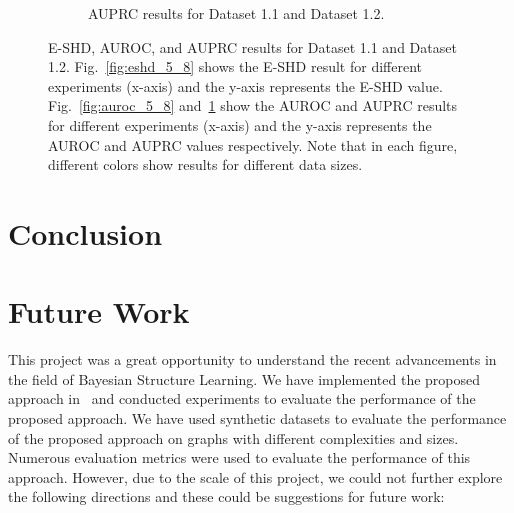 \documentclass{lxaiproposal}
\begin{document}
\begin{figure}[h]
\begin{subfigure}{0.98\textwidth}
            \caption{AUPRC results for Dataset 1.1 and Dataset 1.2.}
            \label{fig:auprc_5_8}
        \end{subfigure}
        \caption{E-SHD, AUROC, and AUPRC results for Dataset 1.1 and Dataset 1.2. Fig.~\ref{fig:eshd_5_8} shows
        the E-SHD result for different experiments (x-axis) and the y-axis represents the E-SHD value. Fig.~\ref{fig:auroc_5_8} and~\ref{fig:auprc_5_8} show the AUROC and AUPRC results for different experiments (x-axis) and the
        y-axis represents the AUROC and AUPRC values respectively. Note that in each figure, different colors show results for different data
        sizes.}
        \label{fig:metrics_dataset_1}
    \end{figure}


    \section{Conclusion}\label{sec:conclusion}
    \vspace*{-3mm}


    \section{Future Work}\label{sec:future_work}
    \vspace*{-3mm}

    This project was a great opportunity to understand the recent advancements in the field of Bayesian Structure
    Learning. We have implemented the proposed approach in~\cite{deleu2022daggflownet} and conducted experiments to
    evaluate the performance of the proposed approach. We have used synthetic datasets to evaluate the performance of
    the proposed approach on graphs with different complexities and sizes. Numerous evaluation metrics were used to
    evaluate the performance of this approach. However, due to the scale of this project, we could not further
    explore the following directions and these could be suggestions for future work:
\end{document}
